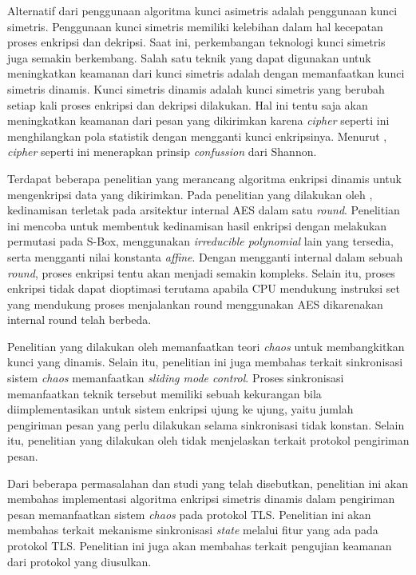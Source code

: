 Alternatif dari penggunaan algoritma kunci asimetris adalah penggunaan kunci simetris. Penggunaan kunci simetris memiliki kelebihan dalam hal kecepatan proses enkripsi dan dekripsi. Saat ini, perkembangan teknologi kunci simetris juga semakin berkembang. Salah satu teknik yang dapat digunakan untuk meningkatkan keamanan dari kunci simetris adalah dengan memanfaatkan kunci simetris dinamis. Kunci simetris dinamis adalah kunci simetris yang berubah setiap kali proses enkripsi dan dekripsi dilakukan. Hal ini tentu saja akan meningkatkan keamanan dari pesan yang dikirimkan karena \emph{cipher} seperti ini menghilangkan pola statistik dengan mengganti kunci enkripsinya. Menurut \textcite{munir2019}, \emph{cipher} seperti ini menerapkan prinsip \emph{confussion} dari Shannon.

Terdapat beberapa penelitian yang merancang algoritma enkripsi dinamis untuk mengenkripsi data yang dikirimkan. Pada penelitian yang dilakukan oleh \textcite{singh2019}, kedinamisan terletak pada arsitektur internal AES dalam satu \emph{round}. Penelitian ini mencoba untuk membentuk kedinamisan hasil enkripsi dengan melakukan permutasi pada S-Box, menggunakan \emph{irreducible polynomial} lain yang tersedia, serta mengganti nilai konstanta \emph{affine}. Dengan mengganti internal dalam sebuah \emph{round}, proses enkripsi tentu akan menjadi semakin kompleks. Selain itu, proses enkripsi tidak dapat dioptimasi terutama apabila CPU mendukung instruksi set yang mendukung proses menjalankan round menggunakan AES dikarenakan internal round telah berbeda.

Penelitian yang dilakukan oleh \textcite{lin2021} memanfaatkan teori \emph{chaos} untuk membangkitkan kunci yang dinamis. Selain itu, penelitian ini juga membahas terkait sinkronisasi sistem \emph{chaos} memanfaatkan \emph{sliding mode control}. Proses sinkronisasi memanfaatkan teknik tersebut memiliki sebuah kekurangan bila diimplementasikan untuk sistem enkripsi ujung ke ujung, yaitu jumlah pengiriman pesan yang perlu dilakukan selama sinkronisasi tidak konstan. Selain itu, penelitian yang dilakukan oleh \textcite{lin2021} tidak menjelaskan terkait protokol pengiriman pesan.

Dari beberapa permasalahan dan studi yang telah disebutkan, penelitian ini akan membahas implementasi algoritma enkripsi simetris dinamis dalam pengiriman pesan memanfaatkan sistem \emph{chaos} pada protokol TLS. Penelitian ini akan membahas terkait mekanisme sinkronisasi \emph{state} melalui fitur yang ada pada protokol TLS. Penelitian ini juga akan membahas terkait pengujian keamanan dari protokol yang diusulkan.

